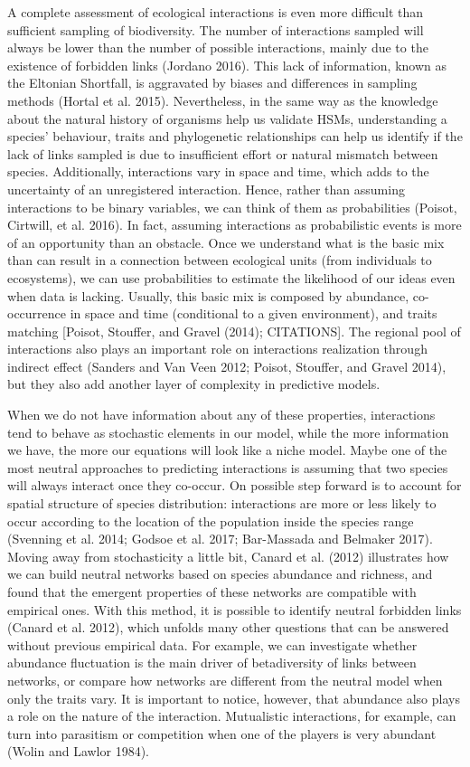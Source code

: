 \documentclass[11pt]{article}
\begin{document}
A complete assessment of ecological interactions is even more difficult
than sufficient sampling of biodiversity. The number of interactions
sampled will always be lower than the number of possible interactions,
mainly due to the existence of forbidden links (Jordano 2016). This lack
of information, known as the Eltonian Shortfall, is aggravated by biases
and differences in sampling methods (Hortal et al. 2015). Nevertheless,
in the same way as the knowledge about the natural history of organisms
help us validate HSMs, understanding a species' behaviour, traits and
phylogenetic relationships can help us identify if the lack of links
sampled is due to insufficient effort or natural mismatch between
species. Additionally, interactions vary in space and time, which adds
to the uncertainty of an unregistered interaction. Hence, rather than
assuming interactions to be binary variables, we can think of them as
probabilities (Poisot, Cirtwill, et al. 2016). In fact, assuming
interactions as probabilistic events is more of an opportunity than an
obstacle. Once we understand what is the basic mix than can result in a
connection between ecological units (from individuals to ecosystems), we
can use probabilities to estimate the likelihood of our ideas even when
data is lacking. Usually, this basic mix is composed by abundance,
co-occurrence in space and time (conditional to a given environment),
and traits matching {[}Poisot, Stouffer, and Gravel (2014);
CITATIONS{]}. The regional pool of interactions also plays an important
role on interactions realization through indirect effect (Sanders and
Van Veen 2012; Poisot, Stouffer, and Gravel 2014), but they also add
another layer of complexity in predictive models.

When we do not have information about any of these properties,
interactions tend to behave as stochastic elements in our model, while
the more information we have, the more our equations will look like a
niche model. Maybe one of the most neutral approaches to predicting
interactions is assuming that two species will always interact once they
co-occur. On possible step forward is to account for spatial structure
of species distribution: interactions are more or less likely to occur
according to the location of the population inside the species range
(Svenning et al. 2014; Godsoe et al. 2017; Bar-Massada and Belmaker
2017). Moving away from stochasticity a little bit, Canard et al. (2012)
illustrates how we can build neutral networks based on species abundance
and richness, and found that the emergent properties of these networks
are compatible with empirical ones. With this method, it is possible to
identify neutral forbidden links (Canard et al. 2012), which unfolds
many other questions that can be answered without previous empirical
data. For example, we can investigate whether abundance fluctuation is
the main driver of betadiversity of links between networks, or compare
how networks are different from the neutral model when only the traits
vary. It is important to notice, however, that abundance also plays a
role on the nature of the interaction. Mutualistic interactions, for
example, can turn into parasitism or competition when one of the players
is very abundant (Wolin and Lawlor 1984).
\end{document}
